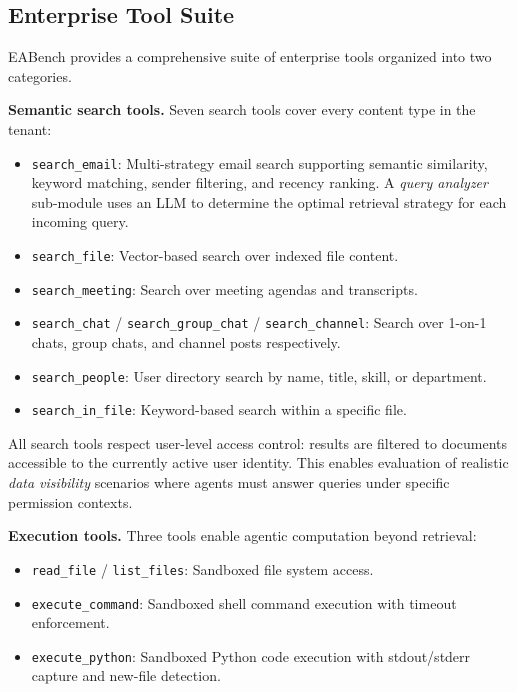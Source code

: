 \documentclass[10pt,twocolumn]{article}
\begin{document}
\subsection{Enterprise Tool Suite}
\label{sec:tools}

EABench provides a comprehensive suite of enterprise tools organized into two
categories.

\textbf{Semantic search tools.}
Seven search tools cover every content type in the tenant:

\begin{itemize}[leftmargin=*,itemsep=1pt]
  \item \texttt{search\_email}: Multi-strategy email search supporting semantic
    similarity, keyword matching, sender filtering, and recency ranking.  A
    \emph{query analyzer} sub-module uses an LLM to determine the optimal
    retrieval strategy for each incoming query.
  \item \texttt{search\_file}: Vector-based search over indexed file content.
  \item \texttt{search\_meeting}: Search over meeting agendas and transcripts.
  \item \texttt{search\_chat} / \texttt{search\_group\_chat} /
    \texttt{search\_channel}: Search over 1-on-1 chats, group chats, and
    channel posts respectively.
  \item \texttt{search\_people}: User directory search by name, title, skill,
    or department.
  \item \texttt{search\_in\_file}: Keyword-based search within a specific file.
\end{itemize}

All search tools respect user-level access control: results are filtered to
documents accessible to the currently active user identity.  This enables
evaluation of realistic \emph{data visibility} scenarios where agents must
answer queries under specific permission contexts.

\textbf{Execution tools.}
Three tools enable agentic computation beyond retrieval:

\begin{itemize}[leftmargin=*,itemsep=1pt]
  \item \texttt{read\_file} / \texttt{list\_files}: Sandboxed file system access.
  \item \texttt{execute\_command}: Sandboxed shell command execution with
    timeout enforcement.
  \item \texttt{execute\_python}: Sandboxed Python code execution with
    stdout/stderr capture and new-file detection.
\end{itemize}
\end{document}
